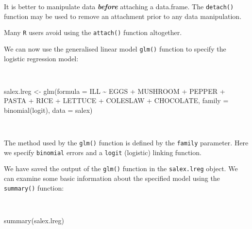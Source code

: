 \documentclass[
  12pt,
  a4paper]{book}
\newenvironment{Shaded}{\begin{snugshade}}{\end{snugshade}}
\newcommand{\AttributeTok}[1]{\textcolor[rgb]{0.77,0.63,0.00}{#1}}
\newcommand{\FunctionTok}[1]{\textcolor[rgb]{0.00,0.00,0.00}{#1}}
\newcommand{\NormalTok}[1]{#1}
\newcommand{\OtherTok}[1]{\textcolor[rgb]{0.56,0.35,0.01}{#1}}
\newcommand{\SpecialCharTok}[1]{\textcolor[rgb]{0.00,0.00,0.00}{#1}}
\begin{document}
It is better to manipulate data \textbf{\emph{before}} attaching a data.frame. The \texttt{detach()} function may be used to remove an attachment prior to any data manipulation.

Many \texttt{R} users avoid using the \texttt{attach()} function altogether.

We can now use the generalised linear model \texttt{glm()} function to specify the logistic regression model:

~

\begin{Shaded}
\begin{Highlighting}[]
\NormalTok{salex.lreg }\OtherTok{\textless{}{-}} \FunctionTok{glm}\NormalTok{(}\AttributeTok{formula =}\NormalTok{ ILL }\SpecialCharTok{\textasciitilde{}}\NormalTok{ EGGS }\SpecialCharTok{+}\NormalTok{ MUSHROOM }\SpecialCharTok{+}\NormalTok{ PEPPER }\SpecialCharTok{+}\NormalTok{ PASTA }\SpecialCharTok{+}
\NormalTok{                  RICE }\SpecialCharTok{+}\NormalTok{ LETTUCE }\SpecialCharTok{+}\NormalTok{ COLESLAW }\SpecialCharTok{+}\NormalTok{ CHOCOLATE,}
                  \AttributeTok{family =} \FunctionTok{binomial}\NormalTok{(logit), }\AttributeTok{data =}\NormalTok{ salex)}
\end{Highlighting}
\end{Shaded}

~

The method used by the \texttt{glm()} function is defined by the \texttt{family} parameter. Here we specify \texttt{binomial} errors and a \texttt{logit} (logistic) linking function.

We have saved the output of the \texttt{glm()} function in the \texttt{salex.lreg} object. We can examine some basic information about the specified model using the \texttt{summary()} function:

~

\begin{Shaded}
\begin{Highlighting}[]
\FunctionTok{summary}\NormalTok{(salex.lreg)}
\end{Highlighting}
\end{Shaded}
\end{document}
